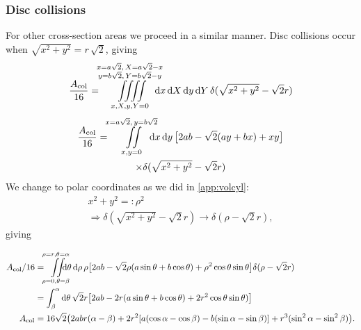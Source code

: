 \documentclass[superscriptaddress,pre,reprint,showpacs,twocolumn]{revtex4-1}
\newcommand{\rd}[1]{\mathrm{d}{#1} \,}
\begin{document}

  \subsubsection{Disc collisions}
  For other cross-section areas we proceed in a similar manner. 
  Disc collisions occur when $\sqrt{x^2 + y^2} = r \, \sqrt{2}$, giving
  \begin{equation}
    \frac{A_\text{col}}{16}  = \iiiint\limits_
         {x,X,y,Y=0}^
         {\substack{x=a\sqrt{2},\, X=a\sqrt{2}-x
             \\ y =  b\sqrt{2},\,  Y=b\sqrt{2}-y}}
         \mkern-18mu
    \rd x \rd X \rd y \rd Y
    \delta (\sqrt{x^2+y^2}-\sqrt{2}r)
  \end{equation}
  \begin{multline}
    \frac{A_\text{col}}{16}  = \iint \limits_{x,y=0}^
      {x=a\sqrt{2},\, y=b\sqrt{2}}
    \mkern-18mu \rd x \rd y 
    \bigl[ 2ab-\sqrt{2}(ay+bx)+xy \bigr] \\
    \times
    \delta (\sqrt{x^2+y^2}-\sqrt{2}r)\\
    \end{multline}
  We change to polar coordinates as we did in \ref{app:volcyl}:
  \begin{align}
    x^2+y^2 =: \rho^2 \\   \Rightarrow   \delta(\sqrt{x^2+y^2}-\sqrt{2}r) \rightarrow
    \delta(\rho-\sqrt{2}r),   
    \end{align}
    giving
  \begin{widetext}
    \begin{align}\label{app:colgeneral}
      A_\text{col}/16 & =\iint\limits_{\rho=0, \theta=\beta}^{\rho=r, \theta=\alpha}
      \mkern-18mu
    \rd \theta \rd \rho \rho
    \bigl[2ab-\sqrt{2}\rho(a\sin\theta+b\cos\theta)+\rho^2\cos\theta\sin\theta
      \bigr]
    \delta(\rho-\sqrt{2}r) \\
    &=\int_\beta^\alpha \rd \theta \sqrt{2}r
    \bigl[
      2ab-2r(a\sin\theta+b\cos\theta)+2r^2\cos\theta\sin\theta)
      \bigr] \\
    A_\text{col} & = 16\sqrt{2} \bigl( 2abr(\alpha-\beta)
    + 2r^2 [a (\cos \alpha-\cos\beta) -b (\sin\alpha -\sin\beta)]
     + r^3(\sin^2 \alpha -\sin^2\beta) \bigr).
    \end{align}
    \end{widetext}
\end{document}
